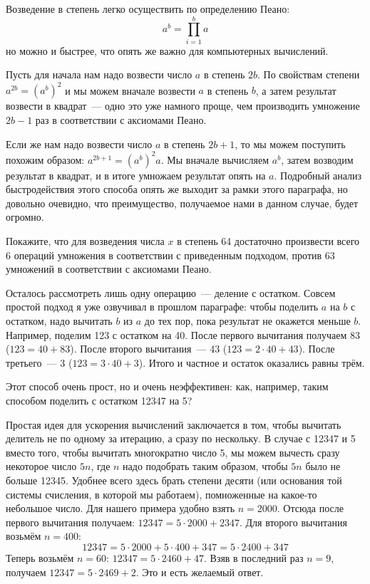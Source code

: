 Возведение в степень легко осуществить по определению Пеано:
$$a^b = \prod_{i=1}^b a$$
но можно и быстрее, что опять же важно для компьютерных вычислений.

Пусть для начала нам надо возвести число $a$ в степень $2b$. По свойствам степени $a^{2b} = (a^b)^2$ и мы можем вначале возвести $a$ в степень $b$, а затем результат возвести в квадрат~--- одно это уже намного проще, чем производить умножение $2b - 1$ раз в соответствии с аксиомами Пеано.

Если же нам надо возвести число $a$ в степень $2b +1$, то мы можем поступить похожим образом: $a^{2b+1} = (a^b)^2a$. Мы вначале вычисляем $a^b$, затем возводим результат в квадрат, и в итоге умножаем результат опять на $a$. Подробный анализ быстродействия этого способа опять же выходит за рамки этого параграфа, но довольно очевидно, что преимущество, получаемое нами в данном случае, будет огромно.
\begin{exercise}
Покажите, что для возведения числа $x$ в степень 64 достаточно произвести всего 6 операций умножения в соответствии с приведенным подходом, против 63 умножений в соответствии с аксиомами Пеано.
\end{exercise}

Осталось рассмотреть лишь одну операцию~--- деление с остатком. Совсем простой подход я уже озвучивал в прошлом параграфе: чтобы поделить $a$ на $b$ с остатком, надо вычитать $b$ из $a$ до тех пор, пока результат не окажется меньше $b$. Например, поделим 123 с остатком на 40. После первого вычитания получаем 83 ($123 = 40 + 83$). После второго вычитания~--- 43 ($123 = 2\cdot 40 + 43$). После третьего~--- 3 ($123 = 3\cdot 40 + 3$). Итого и частное и остаток оказались равны трём.

Этот способ очень прост, но и очень неэффективен: как, например, таким способом поделить с остатком 12347 на 5?

Простая идея для ускорения вычислений заключается в том, чтобы вычитать делитель не по одному за итерацию, а сразу по нескольку. В случае с 12347 и 5 вместо того, чтобы вычитать многократно число 5, мы можем вычесть сразу некоторое число $5n$, где $n$ надо подобрать таким образом, чтобы $5n$ было не больше 12345. Удобнее всего здесь брать степени десяти (или основания той системы счисления, в которой мы работаем), помноженные на какое-то небольшое число. Для нашего примера удобно взять $n=2000$. Отсюда после первого вычитания получаем: $12347 = 5\cdot 2000 + 2347$. Для второго вычитания возьмём $n=400$:
$$12347 = 5\cdot 2000 + 5\cdot 400 + 347 = 5\cdot 2400 + 347$$
Теперь возьмём $n=60$: $12347 = 5\cdot 2460 + 47$. Взяв в последний раз $n=9$, получаем $12347 = 5\cdot 2469 + 2$. Это и есть желаемый ответ.

